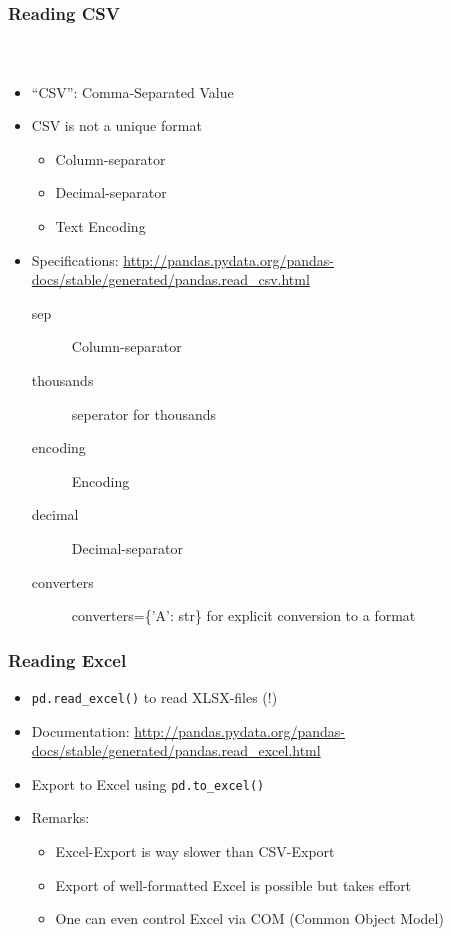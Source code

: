 \documentclass[ngerman]{beamer}
\begin{document}
\begin{frame}[containsverbatim]
\frametitle{Reading CSV}
\framesubtitle{~}

\begin{itemize}
\item \enquote{CSV}: Comma-Separated Value
\item CSV is not a unique format
\begin{itemize}
	\item Column-separator
	\item Decimal-separator
	\item Text Encoding
\end{itemize}
\item Specifications: \url{http://pandas.pydata.org/pandas-docs/stable/generated/pandas.read_csv.html}
\begin{description}
\item[sep] Column-separator
\item[thousands] seperator for thousands
\item[encoding] Encoding
\item [decimal]  Decimal-separator
\item [converters] converters=\{'A': str\} for explicit conversion to a format
\end{description}
\end{itemize}
\end{frame}

\begin{frame}
\frametitle{Reading Excel}

\begin{itemize}
\item \lstinline[language={Python}]{pd.read_excel()} to read XLSX-files (!) \item Documentation: \url{http://pandas.pydata.org/pandas-docs/stable/generated/pandas.read_excel.html}
\item Export to Excel using \lstinline[language={Python}]{pd.to_excel()}
\item Remarks:
\begin{itemize}
	\item Excel-Export is way slower than CSV-Export
	\item Export of well-formatted Excel is possible but takes effort
	\item One can even control Excel via COM (Common Object Model)
\end{itemize}
\end{itemize}
\end{frame}
\end{document}
